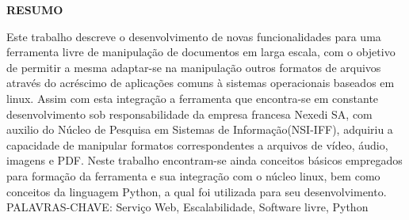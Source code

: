 \begin{center}
\textbf{RESUMO}
\end{center}
\singlespacing

\noindent Este trabalho descreve o desenvolvimento de novas funcionalidades para uma ferramenta livre de manipulação de documentos em larga escala, com o objetivo de permitir a mesma adaptar-se na manipulação outros formatos de arquivos através do acréscimo de aplicações comuns à sistemas operacionais baseados em linux. Assim com esta integração a ferramenta que encontra-se em constante desenvolvimento sob responsabilidade da empresa francesa Nexedi SA, com auxilio do Núcleo de Pesquisa em Sistemas de Informação(NSI-IFF), adquiriu a capacidade de manipular formatos correspondentes a arquivos de vídeo, áudio, imagens e PDF. Neste trabalho encontram-se ainda conceitos básicos empregados para formação da ferramenta e sua integração com o núcleo linux, bem como conceitos da linguagem Python, a qual foi utilizada para seu desenvolvimento. \\

\noindent PALAVRAS-CHAVE:  Serviço Web, Escalabilidade, Software livre, Python